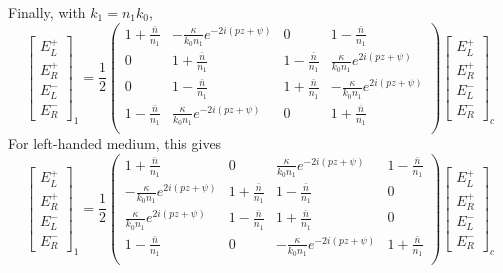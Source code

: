 Finally, with $k_1=n_1k_0$,
\begin{equation}
\begin{bmatrix}
E_L^+\\E_R^+\\E_L^-\\E_R^-
\end{bmatrix}_1 = \frac{1}{2}\begin{pmatrix}
1+\frac{\bar{n}}{n_1} & -\frac{\kappa}{k_0 n_1}e^{-2i(pz+\psi)} & 0 & 1-\frac{\bar{n}}{n_1}\\
0 & 1 + \frac{\bar{n}}{n_1} & 1 -\frac{\bar{n}}{n_1} & \frac{\kappa}{k_0 n_1}e^{2i(pz+\psi)}\\
0 & 1 - \frac{\bar{n}}{n_1} & 1 + \frac{\bar{n}}{n_1} & -\frac{\kappa}{k_0 n_1}e^{2i(pz+\psi)}\\
1-\frac{\bar{n}}{n_1} & \frac{\kappa}{k_0 n_1}e^{-2i(pz+\psi)} & 0 & 1+\frac{\bar{n}}{n_1}\\
\end{pmatrix}\begin{bmatrix}
E_L^+\\E_R^+\\E_L^-\\E_R^-
\end{bmatrix}_c \label{eq:interface_iso_right}
\end{equation}
%
For left-handed medium, this gives
\begin{equation}
\begin{bmatrix}
E_L^+\\E_R^+\\E_L^-\\E_R^-
\end{bmatrix}_1 = \frac{1}{2}\begin{pmatrix}
1+\frac{\bar{n}}{n_1} & 0 & \frac{\kappa}{k_0 n_1}e^{-2i(pz+\psi)} & 1-\frac{\bar{n}}{n_1}\\
-\frac{\kappa}{k_0 n_1}e^{2i(pz+\psi)} & 1 + \frac{\bar{n}}{n_1} & 1 -\frac{\bar{n}}{n_1} & 0\\
\frac{\kappa}{k_0 n_1}e^{2i(pz+\psi)} & 1 - \frac{\bar{n}}{n_1} & 1 + \frac{\bar{n}}{n_1} & 0\\
1-\frac{\bar{n}}{n_1} & 0 & -\frac{\kappa}{k_0 n_1}e^{-2i(pz+\psi)} & 1+\frac{\bar{n}}{n_1}\\
\end{pmatrix}\begin{bmatrix}
E_L^+\\E_R^+\\E_L^-\\E_R^-
\end{bmatrix}_c
\end{equation}

